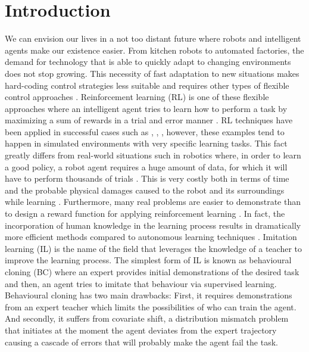 \chapter{Introduction}
\label{chapter:introduction}

\setlength{\parskip}{0.7em}

We can envision our lives in a not too distant future where robots and intelligent agents make our existence easier. From kitchen robots to automated factories, the demand for technology that is able to quickly adapt to changing environments does not stop growing. This necessity of fast adaptation to new situations makes hard-coding control strategies less suitable and requires other types of flexible control approaches \cite{need-of-flexible-control-approaches}. Reinforcement learning (RL) is one of these flexible approaches where an intelligent agent tries to learn how to perform a task by maximizing a sum of rewards in a trial and error manner \cite{Sutton:1998}. RL techniques have been applied in successful cases such as \cite{Atari-RL}, \cite{alphaGO-silver-2016}, \cite{openAI-hand}, however, these examples tend to happen in simulated environments with very specific learning tasks. This fact greatly differs from real-world situations such in robotics where, in order to learn a good policy, a robot agent requires a huge amount of data, for which it will have to perform thousands of trials  \cite{reinforcement-learning-costly-Kober:2013}. This is very costly both in terms of time and the probable physical damages caused to the robot and its surroundings while learning \cite{TAMER-Knox-Stone:2009}. Furthermore, many real problems are easier to demonstrate than to design a reward function for applying reinforcement learning \cite{kostrikov2019imitation}. In fact, the incorporation of human knowledge in the learning process results in dramatically more efficient methods compared to autonomous learning techniques \cite{Global-overview-Attia:2018}. Imitation learning (IL) is the name of the field that leverages the knowledge of a teacher to improve the learning process. The simplest form of IL is known as behavioural cloning (BC) where an expert provides initial demonstrations of the desired task and then, an agent tries to imitate that behaviour via supervised learning. Behavioural cloning has two main drawbacks: First, it requires demonstrations from an expert teacher which limits the possibilities of who can train the agent. And secondly, it suffers from covariate shift, a distribution mismatch problem that initiates at the moment the agent deviates from the expert trajectory causing a cascade of errors that will probably make the agent fail the task.



